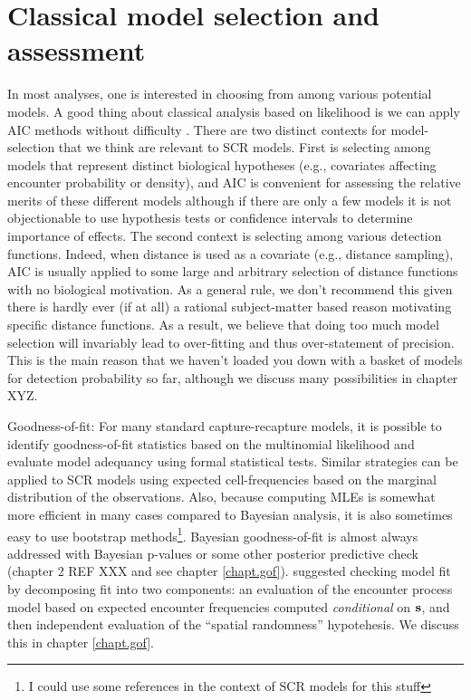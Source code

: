 \section{Classical model selection and assessment}

In most analyses, one is interested in choosing from among various
potential models. A good thing about classical analysis based on
likelihood is we can apply AIC methods without difficulty
\citep{burnham_anderson:2002}. There are two distinct contexts for
model-selection that we think are relevant to SCR models. First is
selecting among models that represent distinct biological hypotheses
(e.g., covariates affecting encounter probability or density), and AIC
is convenient for assessing the relative merits of these different
models although if there are only a few models it is not objectionable
to use hypothesis tests or confidence intervals to determine
importance of effects. The second context is selecting among various
detection functions. 
Indeed, when distance is used as a covariate (e.g., distance
sampling), AIC is usually
applied to some large and arbitrary selection of distance
functions with no biological motivation.
As a general rule, we don’t recommend this given there is hardly ever (if at
all) a rational subject-matter based reason motivating specific 
distance functions. As a result, we believe that doing too much model
selection will
invariably lead to over-fitting and thus over-statement of
precision. This is the main reason that we haven't loaded you down
with a basket of models for detection probability so far, although we
discuss many possibilities in chapter XYZ. 


Goodness-of-fit: For many standard capture-recapture models, it is
possible to identify goodness-of-fit statistics based on the
multinomial likelihood and evaluate model adequancy using formal
statistical tests. Similar strategies can be applied to SCR models
using expected cell-frequencies based on the marginal distribution of
the observations. Also, because computing MLEs is somewhat more
efficient in many cases compared to Bayesian analysis, it is also
sometimes easy to use bootstrap methods\footnote{I could use some
  references in the context of SCR models for this stuff}.
 Bayesian goodness-of-fit is almost always addressed with
Bayesian p-values or some other posterior predictive check (chapter 2 REF
XXX and see chapter \ref{chapt.gof}). 
\citet{royle_etal:2011mee} suggested checking model fit by decomposing
fit into two components: an evaluation of the encounter process model
based on expected encounter frequencies computed {\it conditional} on
${\bf s}$, and then independent evaluation  of the ``spatial randomness''
hypotehesis. We discuss this in chapter \ref{chapt.gof}.


